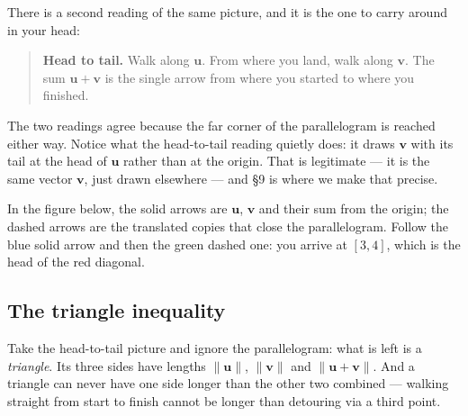\documentclass[11pt]{article}
\theoremstyle{definition}
\theoremstyle{remark}
\newcommand{\vc}[1]{\mathbf{#1}}
\newcommand{\norm}[1]{\lVert #1\rVert}
\newcommand{\lattice}[4]{%
  \draw[step=1cm,gray!25,very thin] (#1,#3) grid (#2,#4);
  \draw[axisline] (#1,0) -- (#2+0.45,0) node[right,font=\scriptsize,black]{$x$};
  \draw[axisline] (0,#3) -- (0,#4+0.45) node[above,font=\scriptsize,black]{$y$};
}
\begin{document}
\noindent There is a second reading of the same picture, and it is the one to
carry around in your head:

\begin{quote}
\textbf{Head to tail.} Walk along $\vc{u}$. From where you land, walk along
$\vc{v}$. The sum $\vc{u}+\vc{v}$ is the single arrow from where you started to
where you finished.
\end{quote}

\noindent The two readings agree because the far corner of the parallelogram is
reached either way. Notice what the head-to-tail reading quietly does: it draws
$\vc{v}$ with its tail at the head of $\vc{u}$ rather than at the origin. That
is legitimate --- it is the same vector $\vc{v}$, just drawn elsewhere --- and
\S9 is where we make that precise.

In the figure below, the solid arrows are $\vc{u}$, $\vc{v}$ and their sum from
the origin; the dashed arrows are the translated copies that close the
parallelogram. Follow the blue solid arrow and then the green dashed one: you
arrive at $[3,4]$, which is the head of the red diagonal.

\begin{center}
\end{center}

\subsection{The triangle inequality}
Take the head-to-tail picture and ignore the parallelogram: what is left is a
\emph{triangle}. Its three sides have lengths $\norm{\vc{u}}$, $\norm{\vc{v}}$
and $\norm{\vc{u}+\vc{v}}$. And a triangle can never have one side longer than
the other two combined --- walking straight from start to finish cannot be
longer than detouring via a third point.
\end{document}
